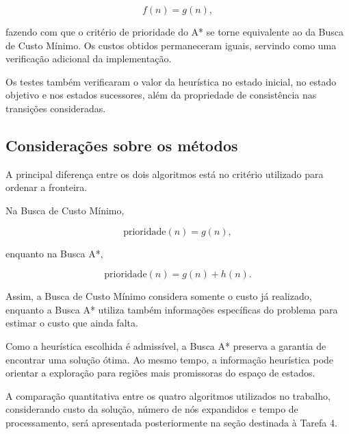 \begin{equation}
	f(n)=g(n),
\end{equation}

fazendo com que o critério de prioridade do A* se torne equivalente ao da
Busca de Custo Mínimo. Os custos obtidos permaneceram iguais, servindo como
uma verificação adicional da implementação.

Os testes também verificaram o valor da heurística no estado inicial, no estado
objetivo e nos estados sucessores, além da propriedade de consistência nas
transições consideradas.

\subsection{Considerações sobre os métodos}

A principal diferença entre os dois algoritmos está no critério utilizado para
ordenar a fronteira.

Na Busca de Custo Mínimo,

\begin{equation}
	\text{prioridade}(n)=g(n),
\end{equation}

enquanto na Busca A*,

\begin{equation}
	\text{prioridade}(n)=g(n)+h(n).
\end{equation}

Assim, a Busca de Custo Mínimo considera somente o custo já realizado, enquanto
a Busca A* utiliza também informações específicas do problema para estimar o
custo que ainda falta.

Como a heurística escolhida é admissível, a Busca A* preserva a garantia de
encontrar uma solução ótima. Ao mesmo tempo, a informação heurística pode
orientar a exploração para regiões mais promissoras do espaço de estados.

A comparação quantitativa entre os quatro algoritmos utilizados no trabalho,
considerando custo da solução, número de nós expandidos e tempo de
processamento, será apresentada posteriormente na seção destinada à Tarefa 4.

